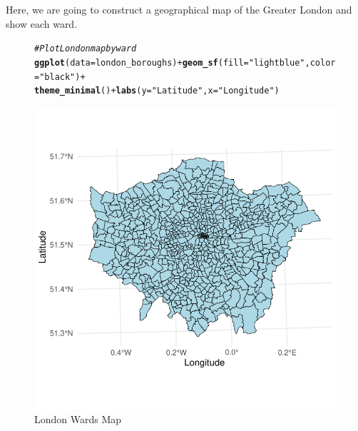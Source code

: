 \documentclass{article}\usepackage[]{graphicx}\usepackage[]{xcolor}
\makeatletter
\def\maxwidth{ %
  \ifdim\Gin@nat@width>\linewidth
    \linewidth
  \else
    \Gin@nat@width
  \fi
}
\newcommand{\hlstr}[1]{\textcolor[rgb]{0.192,0.494,0.8}{#1}}%
\newcommand{\hlcom}[1]{\textcolor[rgb]{0.678,0.584,0.686}{\textit{#1}}}%
\newcommand{\hlopt}[1]{\textcolor[rgb]{0,0,0}{#1}}%
\newcommand{\hlstd}[1]{\textcolor[rgb]{0.345,0.345,0.345}{#1}}%
\newcommand{\hlkwc}[1]{\textcolor[rgb]{0.333,0.667,0.333}{#1}}%
\newcommand{\hlkwd}[1]{\textcolor[rgb]{0.737,0.353,0.396}{\textbf{#1}}}%
\newenvironment{kframe}{%
 \def\at@end@of@kframe{}%
 \ifinner\ifhmode%
  \def\at@end@of@kframe{\end{minipage}}%
  \begin{minipage}{\columnwidth}%
 \fi\fi%
 \def\FrameCommand##1{\hskip\@totalleftmargin \hskip-\fboxsep
 \colorbox{shadecolor}{##1}\hskip-\fboxsep
     \hskip-\linewidth \hskip-\@totalleftmargin \hskip\columnwidth}%
 \MakeFramed {\advance\hsize-\width
   \@totalleftmargin\z@ \linewidth\hsize
   \@setminipage}}%
 {\par\unskip\endMakeFramed%
 \at@end@of@kframe}
\newenvironment{knitrout}{}{} %
\makeatother
\begin{document}
\noindent
Here, we are going to construct a geographical map of the Greater London and show each ward. 

\begingroup
\setlength{\intextsep}{5pt plus 2pt minus 2pt}
\setlength{\textfloatsep}{5pt plus 2pt minus 2pt}
\setlength{\abovecaptionskip}{2pt plus 1pt minus 1pt}
\setlength{\belowcaptionskip}{2pt plus 1pt minus 1pt}

\begin{figure}[H]
\begin{knitrout}\scriptsize
{}\color{fgcolor}\begin{kframe}
\begin{alltt}
\hlcom{# Plot London map by ward}
\hlkwd{ggplot}\hlstd{(}\hlkwc{data} \hlstd{= london_boroughs)} \hlopt{+} \hlkwd{geom_sf}\hlstd{(}\hlkwc{fill} \hlstd{=} \hlstr{"lightblue"}\hlstd{,} \hlkwc{color} \hlstd{=} \hlstr{"black"}\hlstd{)} \hlopt{+}
  \hlkwd{theme_minimal}\hlstd{()} \hlopt{+} \hlkwd{labs}\hlstd{(}\hlkwc{y}\hlstd{=}\hlstr{"Latitude"}\hlstd{,} \hlkwc{x}\hlstd{=}\hlstr{"Longitude"}\hlstd{)}
\end{alltt}
\end{kframe}

{\centering \includegraphics[width=\maxwidth]{figure/beamer-unnamed-chunk-6-1} 

}


\end{knitrout}
\centering
\caption{London Wards Map}
\label{fig:London Wards Map}
\end{figure}
\endgroup
\end{document}
